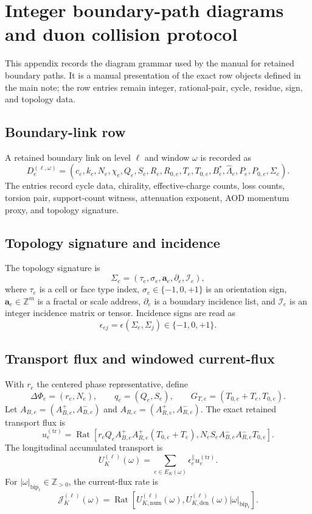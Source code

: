 \section{Integer boundary-path diagrams and duon collision protocol}
\label{app:integer-boundary-path-diagrams}

This appendix records the diagram grammar used by the manual for retained boundary paths. It is a manual presentation of the exact row objects defined in the main note; the row entries remain integer, rational-pair, cycle, residue, sign, and topology data.

\subsection{Boundary-link row}
\label{appD:boundary-link-row}

A retained boundary link on level \(\ell\) and window \(\omega\) is recorded as
\[
D_e^{(\ell,\omega)}=
\left(
 c_e,k_e,N_e,
 \chi_e,
 Q_e,S_e,
 R_e,R_{0,e},
 T_e,T_{0,e},
 B_e^*,\widehat\Lambda_e,
 P_e,P_{0,e},
 \Sigma_e
\right).
\]
The entries record cycle data, chirality, effective-charge counts, loss counts, torsion pair, support-count witness, attenuation exponent, AOD momentum proxy, and topology signature.

\subsection{Topology signature and incidence}
\label{appD:topology-incidence}

The topology signature is
\[
\Sigma_e=(\tau_e,\sigma_e,\mathbf a_e,\partial_e,\mathcal I_e),
\]
where \(\tau_e\) is a cell or face type index, \(\sigma_e\in\{-1,0,+1\}\) is an orientation sign, \(\mathbf a_e\in\mathbb Z^m\) is a fractal or scale address, \(\partial_e\) is a boundary incidence list, and \(\mathcal I_e\) is an integer incidence matrix or tensor. Incidence signs are read as
\[
\epsilon_{ej}=\epsilon(\Sigma_e,\Sigma_j)\in\{-1,0,+1\}.
\]

\subsection{Transport flux and windowed current-flux}
\label{appD:transport-current-flux}

With \(r_e\) the centered phase representative, define
\[
\Delta\Phi_e=(r_e,N_e),
\qquad
q_e=(Q_e,S_e),
\qquad
G_{T,e}=(T_{0,e}+T_e,T_{0,e}).
\]
Let \(A_{B,e}=(A_{B,e}^{+},A_{B,e}^{-})\) and \(A_{R,e}=(A_{R,e}^{+},A_{R,e}^{-})\). The exact retained transport flux is
\[
u_e^{(\mathrm{tr})}
=
\operatorname{Rat}
\left[
 r_e Q_e A_{B,e}^{+} A_{R,e}^{+}(T_{0,e}+T_e),
 N_e S_e A_{B,e}^{-} A_{R,e}^{-}T_{0,e}
\right].
\]
The longitudinal accumulated transport is
\[
U_K^{(\ell)}(\omega)=
\sum_{e\in E_K(\omega)}\epsilon_e^{\parallel}u_e^{(\mathrm{tr})}.
\]
For \(|\omega|_{\mathrm{bip}_{\ell}}\in\mathbb Z_{>0}\), the current-flux rate is
\[
\mathcal J_K^{(\ell)}(\omega)=
\operatorname{Rat}
\left[
U_{K,\mathrm{num}}^{(\ell)}(\omega),
U_{K,\mathrm{den}}^{(\ell)}(\omega)|\omega|_{\mathrm{bip}_{\ell}}
\right].
\]

